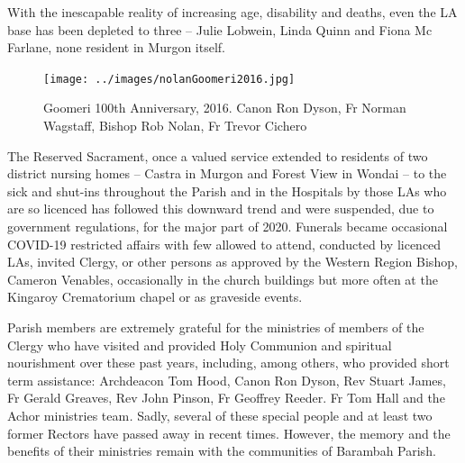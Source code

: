 With the inescapable reality of increasing age, disability and deaths, even the LA base has been depleted to three -- Julie Lobwein, Linda Quinn and Fiona Mc Farlane, none resident in Murgon itself.









\begin{figure}[!htb]
\begin{center}
\texttt{[image: ../images/nolanGoomeri2016.jpg]}
\caption{Goomeri 100th Anniversary, 2016. Canon Ron Dyson, Fr Norman Wagstaff, Bishop Rob Nolan, Fr Trevor Cichero}
\end{center}
\end{figure}




The Reserved Sacrament, once a valued service extended to residents of two district nursing homes -- Castra in Murgon and Forest View in Wondai -- to the sick and shut-ins throughout the Parish and in the Hospitals by those LAs who are so licenced has followed this downward trend and were suspended, due to government regulations, for the major part of 2020. Funerals became occasional COVID-19 restricted affairs with few allowed to attend, conducted by licenced LAs, invited Clergy, or other persons as approved by the Western Region Bishop, Cameron Venables, occasionally in the church buildings but more often at the Kingaroy Crematorium chapel or as graveside events.



Parish members are extremely grateful for the ministries of members of the Clergy who have visited and provided Holy Communion and spiritual nourishment over these past years, including, among others, who provided short term assistance: Archdeacon Tom Hood, Canon Ron Dyson, Rev Stuart James, Fr Gerald Greaves, Rev John Pinson, Fr Geoffrey Reeder. Fr Tom Hall and the Achor ministries team\emph{.} Sadly, several of these special people and at least two former Rectors have passed away in recent times. However, the memory and the benefits of their ministries remain with the communities of Barambah Parish.



\balance


